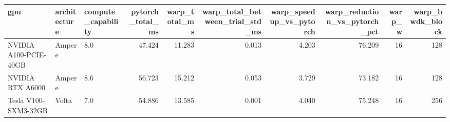 \begin{tabular}{lllrrrrrrr}
\toprule
gpu & architecture & compute_capability & pytorch_total_ms & warp_total_ms & warp_total_between_trial_std_ms & warp_speedup_vs_pytorch & warp_reduction_vs_pytorch_pct & warp_w & warp_bwdk_block \\
\midrule
NVIDIA A100-PCIE-40GB & Ampere & 8.0 & 47.424 & 11.283 & 0.013 & 4.203 & 76.209 & 16 & 128 \\
NVIDIA RTX A6000 & Ampere & 8.6 & 56.723 & 15.212 & 0.053 & 3.729 & 73.182 & 16 & 128 \\
Tesla V100-SXM3-32GB & Volta & 7.0 & 54.886 & 13.585 & 0.001 & 4.040 & 75.248 & 16 & 256 \\
\bottomrule
\end{tabular}
